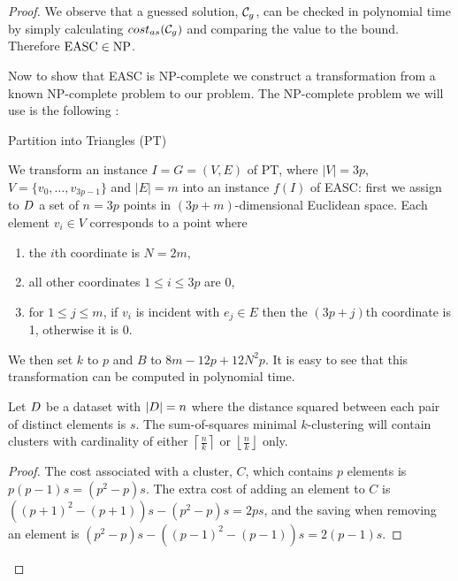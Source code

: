\begin{proof}
  We observe that a guessed solution, $\mathcal{C}_g$, can be checked in polynomial
  time by simply calculating $cost_{as}(\mathcal{C}_g)$ and comparing the value to
  the bound.  Therefore $\text{EASC} \in \text{NP}$.
  
  Now to show that EASC is NP-complete we construct a transformation from a
  known NP-complete problem to our problem.  The NP-complete problem we will
  use is the following \citep{gareyjohnson79}:
  \begin{problem}{Partition into Triangles (PT)}
  \end{problem}

  We transform an instance $I = G = (V,E)$ of PT, where $|V|=3p$, $V = \{v_0,
  \dotsc, v_{3p-1}\}$ and $|E|=m$ into an instance $f(I)$ of EASC: first we
  assign to $D$ a set of $n=3p$ points in $(3p+m)$-dimensional Euclidean
  space.  Each element $v_i \in V$ corresponds to a point where
  \begin{enumerate}
  \item the $i$th coordinate is $N = 2m$,
  \item all other coordinates $1 \leq i \leq 3p$ are 0,
  \item for $1 \leq j \leq m$, if $v_i$ is incident with $e_j \in E$ then the
    $(3p+j)$th coordinate is 1, otherwise it is 0.
  \end{enumerate}
  We then set $k$ to $p$ and $B$ to $8m-12p+12N^2p$.  It is easy to see that
  this transformation can be computed in polynomial time.

  \begin{lem}
    \label{lem:eq-dis}
    Let $D$ be a dataset with $|D| = n$ where the distance squared
    between each pair of distinct elements is $s$.  The sum-of-squares minimal
    $k$-clustering will contain clusters with cardinality of either
    $\left\lceil \frac{n}{k} \right\rceil$ or $\left\lfloor \frac{n}{k}
    \right\rfloor$ only.
  \end{lem}

  \begin{proof}
    The cost associated with a cluster, $C$, which contains $p$ elements is
    $p(p-1)s = (p^2-p)s$.  The extra cost of adding an element to $C$ is
    $((p+1)^2 - (p+1))s - (p^2-p)s = 2ps$, and the saving when removing an
    element is $(p^2 - p)s - ((p-1)^2 - (p-1))s = 2(p - 1)s$.


\end{proof}
\end{proof}
